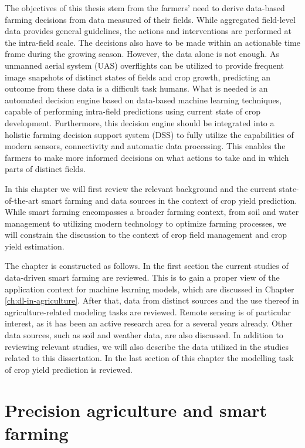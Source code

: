 The objectives of this thesis stem from the farmers' need to derive data-based farming decisions from data measured of their fields. While aggregated field-level data provides general guidelines, the actions and interventions are performed at the intra-field scale. The decisions also have to be made within an actionable time frame during the growing season. However, the data alone is not enough. As unmanned aerial system (UAS) overflights can be utilized to provide frequent image snapshots of distinct states of fields and crop growth, predicting an outcome from these data is a difficult task humans. What is needed is an automated decision engine based on data-based machine learning techniques, capable of performing intra-field predictions using current state of crop development. Furthermore, this decision engine should be integrated into a holistic farming decision support system (DSS) to fully utilize the capabilities of modern sensors, connectivity and automatic data processing. This enables the farmers to make more informed decisions on what actions to take and in which parts of distinct fields. 

In this chapter we will first review the relevant background and the current state-of-the-art smart farming and data sources in the context of crop yield prediction. While smart farming encompasses a broader farming context, from soil and water management to utilizing modern technology to optimize farming processes, we will constrain the discussion to the context of crop field management and crop yield estimation. 

The chapter is constructed as follows. In the first section the current studies of data-driven smart farming are reviewed. This is to gain a proper view of the application context for machine learning models, which are discussed in Chapter \ref{ch:dl-in-agriculture}. After that, data from distinct sources and the use thereof in agriculture-related modeling tasks are reviewed. Remote sensing is of particular interest, as it has been an active research area for a several years already. Other data sources, such as soil and weather data, are also discussed. In addition to reviewing relevant studies, we will also describe the data utilized in the studies related to this dissertation. In the last section of this chapter the modelling task of crop yield prediction is reviewed.


\section{Precision agriculture and smart farming}
\label{sec:smart-farming-review}

